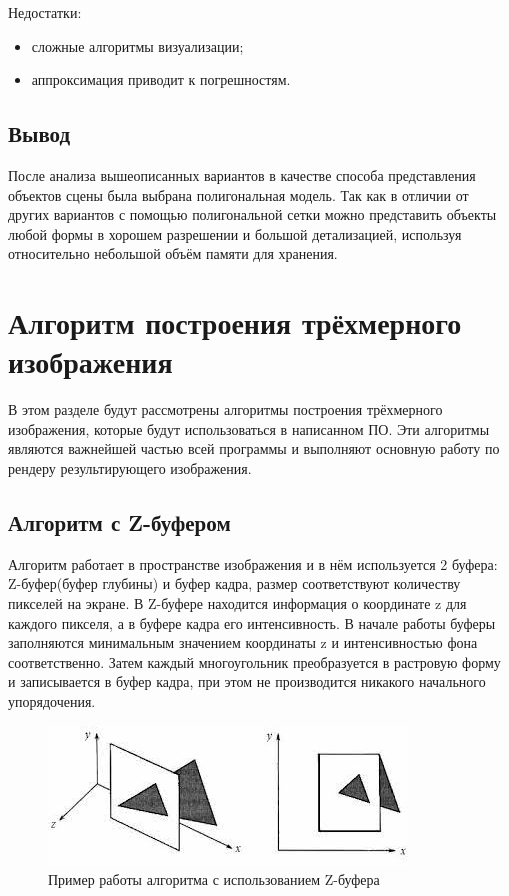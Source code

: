\documentclass[12pt,a4paper,oneside]{report}
\begin{document}
    		Недостатки:
    		\begin{itemize}
    			\item сложные алгоритмы визуализации;
    			\item аппроксимация приводит к погрешностям.
    		\end{itemize}
    		\subsection{Вывод}
    		\quad После анализа вышеописанных вариантов в качестве способа представления объектов сцены была выбрана полигональная модель. Так как в отличии от других вариантов с помощью полигональной сетки можно представить объекты любой формы в хорошем разрешении и большой детализацией, используя относительно небольшой объём памяти для хранения.
    	\section{Алгоритм построения трёхмерного изображения}
    		\quad В этом разделе будут рассмотрены алгоритмы построения трёхмерного изображения, которые будут использоваться в написанном ПО. Эти алгоритмы являются важнейшей частью всей программы и выполняют основную работу по рендеру результирующего изображения.
    		\subsection{Алгоритм с Z-буфером}
    			\quad Алгоритм работает в пространстве изображения и в нём используется 2 буфера: Z-буфер(буфер глубины) и буфер кадра, размер соответствуют количеству пикселей на экране. В Z-буфере находится информация о координате z для каждого пикселя, а в буфере кадра его интенсивность. В начале работы буферы заполняются минимальным значением координаты z и интенсивностью фона соответственно. Затем каждый многоугольник преобразуется в растровую форму и записывается в буфер кадра, при этом не производится никакого начального упорядочения.
    			
    			\begin{figure}[h]
					\centering
					\includegraphics[scale=0.6]{zbuf}
					\caption{Пример работы алгоритма с использованием Z-буфера}
				\end{figure}
    			
\end{document}
